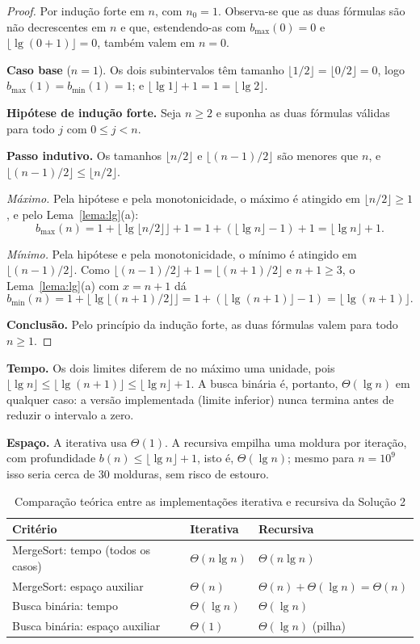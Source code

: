 \documentclass[11pt,a4paper]{article}
\begin{document}
\begin{proof}
Por indução forte em $n$, com $n_0=1$. Observa-se que as duas fórmulas são não decrescentes em $n$ e que, estendendo-as com $b_{\max}(0)=0$ e $\lfloor\lg(0+1)\rfloor=0$, também valem em $n=0$.

\textbf{Caso base} ($n=1$). Os dois subintervalos têm tamanho $\lfloor1/2\rfloor=\lfloor0/2\rfloor=0$, logo $b_{\max}(1)=b_{\min}(1)=1$; e $\lfloor\lg1\rfloor+1=1=\lfloor\lg2\rfloor$.

\textbf{Hipótese de indução forte.} Seja $n\ge2$ e suponha as duas fórmulas válidas para todo $j$ com $0\le j<n$.

\textbf{Passo indutivo.} Os tamanhos $\lfloor n/2\rfloor$ e $\lfloor(n-1)/2\rfloor$ são menores que $n$, e $\lfloor(n-1)/2\rfloor\le\lfloor n/2\rfloor$.

\emph{Máximo.} Pela hipótese e pela monotonicidade, o máximo é atingido em $\lfloor n/2\rfloor\ge1$, e pelo Lema~\ref{lema:lg}(a):
\[
b_{\max}(n)=1+\lfloor\lg\lfloor n/2\rfloor\rfloor+1=1+(\lfloor\lg n\rfloor-1)+1=\lfloor\lg n\rfloor+1.
\]

\emph{Mínimo.} Pela hipótese e pela monotonicidade, o mínimo é atingido em $\lfloor(n-1)/2\rfloor$. Como $\lfloor(n-1)/2\rfloor+1=\lfloor(n+1)/2\rfloor$ e $n+1\ge3$, o Lema~\ref{lema:lg}(a) com $x=n+1$ dá
\[
b_{\min}(n)=1+\lfloor\lg\lfloor(n+1)/2\rfloor\rfloor=1+(\lfloor\lg(n+1)\rfloor-1)=\lfloor\lg(n+1)\rfloor.
\]

\textbf{Conclusão.} Pelo princípio da indução forte, as duas fórmulas valem para todo $n\ge1$.
\end{proof}

\textbf{Tempo.} Os dois limites diferem de no máximo uma unidade, pois $\lfloor\lg n\rfloor\le\lfloor\lg(n+1)\rfloor\le\lfloor\lg n\rfloor+1$. A busca binária é, portanto, $\Theta(\lg n)$ em qualquer caso: a versão implementada (limite inferior) nunca termina antes de reduzir o intervalo a zero.

\textbf{Espaço.} A iterativa usa $\Theta(1)$. A recursiva empilha uma moldura por iteração, com profundidade $b(n)\le\lfloor\lg n\rfloor+1$, isto é, $\Theta(\lg n)$; mesmo para $n=10^9$ isso seria cerca de 30 molduras, sem risco de estouro.

\begin{table}[H]
\centering
\caption{Comparação teórica entre as implementações iterativa e recursiva da Solução 2}
\begin{tabular}{lll}
\toprule
Critério & Iterativa & Recursiva \\
\midrule
MergeSort: tempo (todos os casos) & $\Theta(n\lg n)$ & $\Theta(n\lg n)$ \\
MergeSort: espaço auxiliar & $\Theta(n)$ & $\Theta(n)+\Theta(\lg n)=\Theta(n)$ \\
Busca binária: tempo & $\Theta(\lg n)$ & $\Theta(\lg n)$ \\
Busca binária: espaço auxiliar & $\Theta(1)$ & $\Theta(\lg n)$ (pilha) \\
\bottomrule
\end{tabular}
\end{table}
\end{document}
